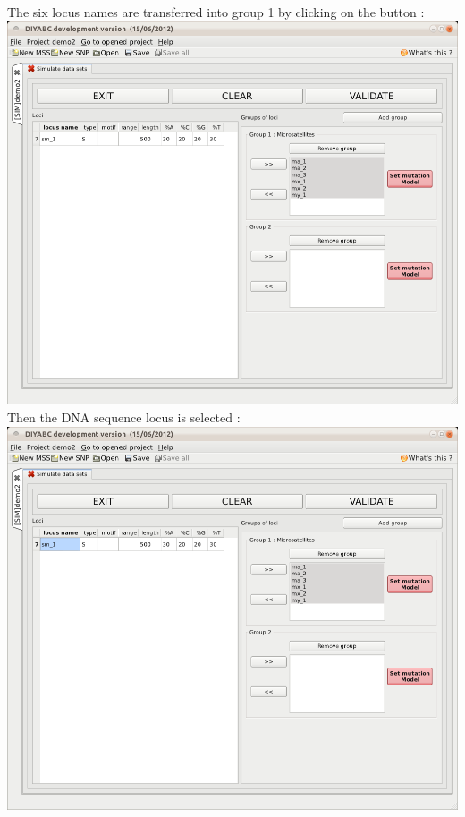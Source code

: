The six locus names are transferred into group 1 by clicking on the
\fbox{\textsf{$>>$}} button :\\


\includegraphics[scale=0.33]{gui_pictures/Capture-DIYABC-77} \\


Then the DNA sequence locus is selected :\\


\includegraphics[scale=0.33]{gui_pictures/Capture-DIYABC-78} \\


